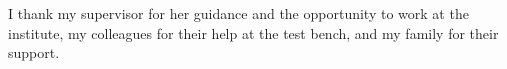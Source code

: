 I thank my supervisor for her guidance and the opportunity to work at the institute, my
colleagues for their help at the test bench, and my family for their support.
